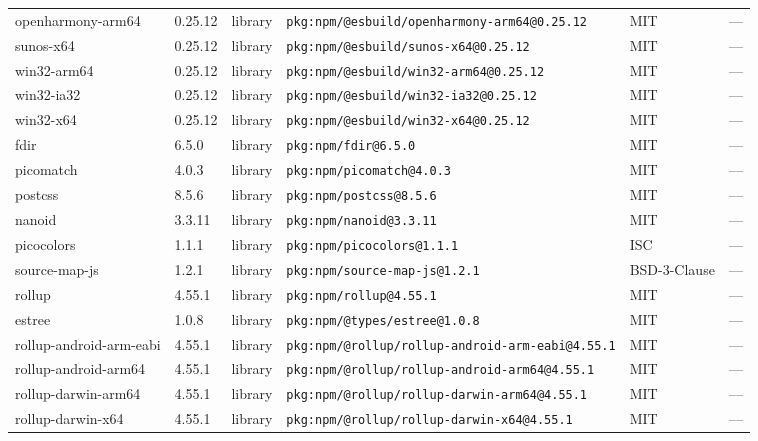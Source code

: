 \documentclass[11pt,a4paper]{article}
\begin{document}
\begin{longtable}{|p{4cm}|p{2cm}|p{1.6cm}|p{5cm}|p{1.5cm}|p{3.5cm}|}
\raggedright openharmony-arm64 & 0.25.12 & library & \small\texttt{pkg:npm/@esbuild/openharmony-arm64@0.25.12} & MIT & \small — \\
\raggedright sunos-x64 & 0.25.12 & library & \small\texttt{pkg:npm/@esbuild/sunos-x64@0.25.12} & MIT & \small — \\
\raggedright win32-arm64 & 0.25.12 & library & \small\texttt{pkg:npm/@esbuild/win32-arm64@0.25.12} & MIT & \small — \\
\raggedright win32-ia32 & 0.25.12 & library & \small\texttt{pkg:npm/@esbuild/win32-ia32@0.25.12} & MIT & \small — \\
\raggedright win32-x64 & 0.25.12 & library & \small\texttt{pkg:npm/@esbuild/win32-x64@0.25.12} & MIT & \small — \\
\raggedright fdir & 6.5.0 & library & \small\texttt{pkg:npm/fdir@6.5.0} & MIT & \small — \\
\raggedright picomatch & 4.0.3 & library & \small\texttt{pkg:npm/picomatch@4.0.3} & MIT & \small — \\
\raggedright postcss & 8.5.6 & library & \small\texttt{pkg:npm/postcss@8.5.6} & MIT & \small — \\
\raggedright nanoid & 3.3.11 & library & \small\texttt{pkg:npm/nanoid@3.3.11} & MIT & \small — \\
\raggedright picocolors & 1.1.1 & library & \small\texttt{pkg:npm/picocolors@1.1.1} & ISC & \small — \\
\raggedright source-map-js & 1.2.1 & library & \small\texttt{pkg:npm/source-map-js@1.2.1} & BSD-3-Clause & \small — \\
\raggedright rollup & 4.55.1 & library & \small\texttt{pkg:npm/rollup@4.55.1} & MIT & \small — \\
\raggedright estree & 1.0.8 & library & \small\texttt{pkg:npm/@types/estree@1.0.8} & MIT & \small — \\
\raggedright rollup-android-arm-eabi & 4.55.1 & library & \small\texttt{pkg:npm/@rollup/rollup-android-arm-eabi@4.55.1} & MIT & \small — \\
\raggedright rollup-android-arm64 & 4.55.1 & library & \small\texttt{pkg:npm/@rollup/rollup-android-arm64@4.55.1} & MIT & \small — \\
\raggedright rollup-darwin-arm64 & 4.55.1 & library & \small\texttt{pkg:npm/@rollup/rollup-darwin-arm64@4.55.1} & MIT & \small — \\
\raggedright rollup-darwin-x64 & 4.55.1 & library & \small\texttt{pkg:npm/@rollup/rollup-darwin-x64@4.55.1} & MIT & \small — \\

\end{longtable}
\end{document}
